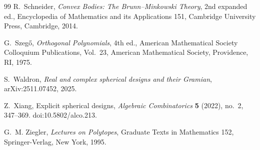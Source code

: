 \documentclass[11pt]{amsart}
\theoremstyle{definition}
\theoremstyle{remark}
\begin{document}
\begin{thebibliography}{99}
R.~Schneider,
\newblock \emph{Convex Bodies: The Brunn--Minkowski Theory}, 2nd expanded ed.,
\newblock Encyclopedia of Mathematics and its Applications 151, Cambridge University Press, Cambridge, 2014.

G.~Szeg\H{o},
\newblock \emph{Orthogonal Polynomials}, 4th ed.,
\newblock American Mathematical Society Colloquium Publications, Vol.~23,
\newblock American Mathematical Society, Providence, RI, 1975.

S.~Waldron,
\newblock \emph{Real and complex spherical designs and their Gramian},
\newblock arXiv:2511.07452, 2025.

Z.~Xiang,
\newblock Explicit spherical designs,
\newblock \emph{Algebraic Combinatorics} \textbf{5} (2022), no.~2, 347--369.
\newblock doi:10.5802/alco.213.

G.~M. Ziegler,
\newblock \emph{Lectures on Polytopes},
\newblock Graduate Texts in Mathematics 152, Springer-Verlag, New York, 1995.

\end{thebibliography}
\end{document}
